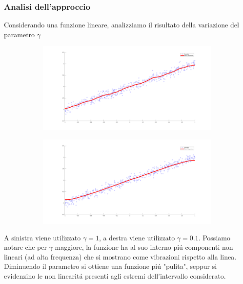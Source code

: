 \documentclass[12pt]{article}
\begin{document}
\subsubsection{Analisi dell'approccio}
Considerando una funzione lineare, analizziamo il risultato della variazione
del parametro $\gamma$
\begin{figure}[H]
  \centering
  \begin{subfigure}{0.45\textwidth}
    \includegraphics[width=\textwidth]{images/KernelRegressionLineBigGamma}
  \end{subfigure}
  \begin{subfigure}{0.45\textwidth}
    \includegraphics[width=\textwidth]{images/KernelRegressionLineSmallGamma}
  \end{subfigure}
\end{figure}
A sinistra viene utilizzato $\gamma = 1$, a destra viene utilizzato $\gamma = 0.1$.
Possiamo notare che per $\gamma$ maggiore, la funzione ha al suo interno piú componenti
non lineari (ad alta frequenza) che si mostrano come vibrazioni rispetto alla linea. \\
Diminuendo il parametro si ottiene una funzione piú "pulita", seppur si evidenzino le non linearitá presenti
agli estremi dell'intervallo considerato.
\end{document}
